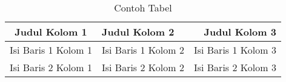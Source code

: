 \begin{table}[htbp]
\begin{center}
\begin{tabular}{|c|l|r|}
\hline
  Judul Kolom 1 & Judul Kolom 2 & Judul Kolom 3 \\
\hline
  Isi Baris 1 Kolom 1 & Isi Baris 1 Kolom 2 & Isi Baris 1 Kolom 3 \\
  Isi Baris 2 Kolom 1 & Isi Baris 2 Kolom 2 & Isi Baris 2 Kolom 3 \\
\hline
\end{tabular}
\caption{Contoh Tabel}
\end{center}
\end{table}